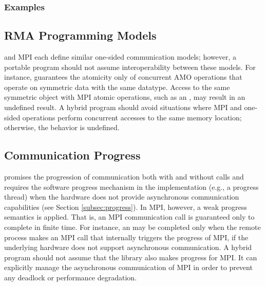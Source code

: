 \subsubsection*{Examples}
\label{subsubsec:interoperability:id:example}




\subsection{RMA Programming Models}
\label{subsec:interoperability:rma}

\openshmem and \ac{MPI} each define similar one-sided communication models;
however, a portable program should not assume interoperability between these
models.
For instance, \openshmem guarantees the atomicity only of concurrent \openshmem \ac{AMO} operations
that operate on symmetric data with the same datatype. Access to the same symmetric
object with \ac{MPI} atomic operations, such as an , may
result in an undefined result. A hybrid program should avoid situations where \ac{MPI} and
\openshmem one-sided operations perform concurrent accesses to the same memory
location; otherwise, the behavior is undefined.

\subsection{Communication Progress}
\label{subsec:interoperability:progress}

\openshmem promises the progression of communication both with and without
\openshmem calls and requires the software progress mechanism in the implementation
(e.g., a progress thread) when the hardware does not provide asynchronous communication
capabilities (see Section \ref{subsec:progress}).
In \ac{MPI}, however, a weak progress semantics is applied. That is,
an \ac{MPI} communication call is guaranteed only to complete in finite time. For
instance, an  may be completed only when the remote process makes an \ac{MPI}
call that internally triggers the progress of \ac{MPI}, if the underlying hardware
does not support asynchronous communication. A hybrid program
should not assume that the \openshmem library also makes progress for \ac{MPI}.
It can explicitly manage the asynchronous communication of \ac{MPI} in
order to prevent any deadlock or performance degradation.
